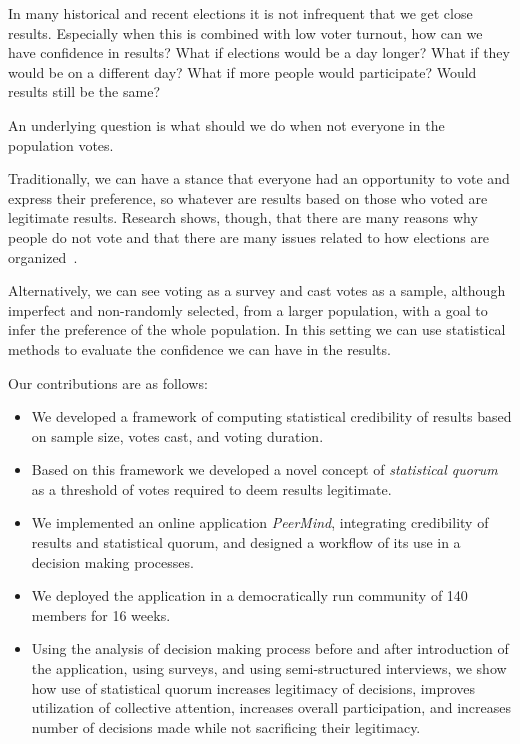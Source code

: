 \documentclass[chi_draft]{sigchi}
\begin{document}
In many historical and recent elections it is not infrequent that we get close results.
Especially when this is combined with low voter turnout, how can we have confidence in results?
What if elections would be a day longer? What if they would be on a different day? What if
more people would participate? Would results still be the same?

An underlying question is what should we do when not everyone in the population votes.

Traditionally, we can have a stance that everyone had an opportunity to vote and express
their preference, so whatever are results based on those who voted are legitimate results.
Research shows, though, that there are many reasons why people do not vote and that there
are many issues related to how elections are organized~\cite{CANCELA2016264, GIMPEL2003471}.

Alternatively, we can see voting as a survey and cast votes as a sample, although imperfect
and non-randomly selected, from a larger population, with a goal to infer the preference
of the whole population. In this setting we can use statistical methods to evaluate the
confidence we can have in the results.


Our contributions are as follows:

\begin{itemize}
\item We developed a framework of computing statistical credibility of results
based on sample size, votes cast, and voting duration.
\item Based on this framework we developed a novel concept of \emph{statistical quorum}
as a threshold of votes required to deem results legitimate.
\item We implemented an online application \emph{PeerMind},
integrating credibility of results and statistical quorum, and designed
a workflow of its use in a decision making processes.
\item We deployed the application in a democratically run community of 140
members for 16 weeks.
\item Using the analysis of decision making process before and after introduction
of the application, using surveys, and using semi-structured interviews, we show
how use of statistical quorum increases legitimacy of decisions,
improves utilization of collective attention, increases overall participation,
and increases number of decisions made while not sacrificing their legitimacy.
\end{itemize}
\end{document}
